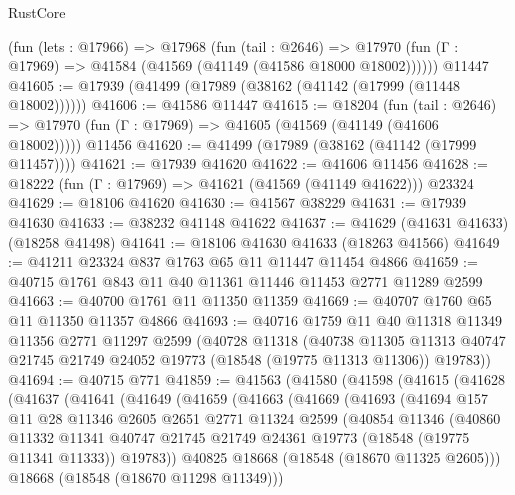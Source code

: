 \begin{lexlean}{RustCore}
\begin{coremodule}
    (fun (lets : @17966) =>
    @17968
      (fun (tail : @2646) =>
      @17970 (fun (Γ : @17969) => @41584 (@41569 (@41149 (@41586 @18000 @18002))))))
    @11447
@41605 := @17939 (@41499 (@17989 (@38162 (@41142 (@17999 (@11448 @18002))))))
@41606 := @41586 @11447
@41615 := @18204
    (fun (tail : @2646) => @17970 (fun (Γ : @17969) => @41605 (@41569 (@41149 (@41606 @18002)))))
    @11456
@41620 := @41499 (@17989 (@38162 (@41142 (@17999 @11457))))
@41621 := @17939 @41620
@41622 := @41606 @11456
@41628 := @18222 (fun (Γ : @17969) => @41621 (@41569 (@41149 @41622))) @23324
@41629 := @18106 @41620
@41630 := @41567 @38229
@41631 := @17939 @41630
@41633 := @38232 @41148 @41622
@41637 := @41629 (@41631 @41633) (@18258 @41498)
@41641 := @18106 @41630 @41633 (@18263 @41566)
@41649 := @41211 @23324 @837 @1763 @65 @11 @11447 @11454 @4866
@41659 := @40715 @1761 @843 @11 @40 @11361 @11446 @11453 @2771 @11289 @2599
@41663 := @40700 @1761 @11 @11350 @11359
@41669 := @40707 @1760 @65 @11 @11350 @11357 @4866
@41693 := @40716
    @1759
    @11
    @40
    @11318
    @11349
    @11356
    @2771
    @11297
    @2599
    (@40728
      @11318
      (@40738
        @11305
        @11313
        @40747
        @21745
        @21749
        @24052
        @19773
        (@18548 (@19775 @11313 @11306))
        @19783))
@41694 := @40715 @771
@41859 := @41563
    (@41580
      (@41598
        (@41615
          (@41628
            (@41637
              (@41641
                (@41649
                  (@41659
                    (@41663
                      (@41669
                        (@41693
                          (@41694
                            @157
                            @11
                            @28
                            @11346
                            @2605
                            @2651
                            @2771
                            @11324
                            @2599
                            (@40854
                              @11346
                              (@40860
                                @11332
                                @11341
                                @40747
                                @21745
                                @21749
                                @24361
                                @19773
                                (@18548 (@19775 @11341 @11333))
                                @19783))
                            @40825
                            @18668
                            (@18548 (@18670 @11325 @2605)))
                          @18668
                          (@18548 (@18670 @11298 @11349)))

\end{coremodule}
\end{lexlean}
